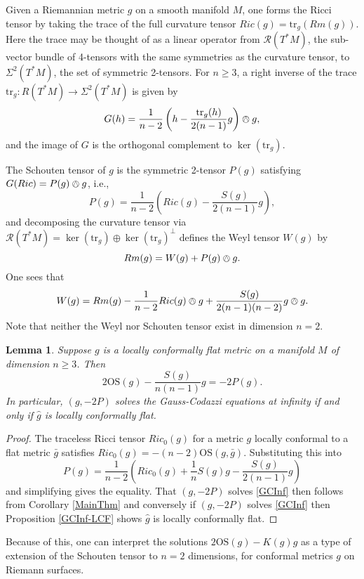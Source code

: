 \documentclass{amsart}
\newcommand{\tr}{\mathrm{tr}}
\newtheorem{lem}[thm]{Lemma}
\numberwithin{equation}{section}
\begin{document}
Given a Riemannian metric $g$ on a smooth manifold $M$, one forms the Ricci tensor by taking the trace of the full curvature tensor $Ric(g) = \tr_g(Rm(g))$.
Here the trace may be thought of as a linear operator from $\mathcal{R}(T^*M)$, the sub-vector bundle of 4-tensors with the same symmetries as the curvature tensor, to $\Sigma^2(T^*M)$, the set of symmetric 2-tensors.
For $n\geq 3$, a right inverse of the trace $\tr_g: R(T^*M) \to \Sigma^2(T^*M)$ is given by 
\[
G(h) = \frac{1}{n-2}\left( h - \frac{\tr_g(h)}{2(n-1)} g \right) \owedge g,
\]
and the image of $G$ is the orthogonal complement to $\ker(\tr_g)$.

The Schouten tensor of $g$ is the symmetric 2-tensor $P(g)$ satisfying $G(Ric) = P(g) \owedge g$, i.e., 
\[
P(g) = \frac{1}{n-2}\left( Ric(g) - \frac{S(g)}{2(n-1)} g \right),
\]
and decomposing the curvature tensor via $\mathcal{R}(T^*M) = \ker(\tr_g) \oplus \ker(\tr_g)^\perp$ defines the Weyl tensor $W(g)$ by 
\begin{equation}
\label{Weyl}
Rm(g) = W(g) + P(g)\owedge g.
\end{equation}
One sees that 
\[
W(g) = Rm(g) - \frac{1}{n-2}Ric(g) \owedge g + \frac{S(g)}{2(n-1)(n-2)} g \owedge g.
\]
Note that neither the Weyl nor Schouten tensor exist in dimension $n = 2$.
\begin{lem}
\label{SchoutenSolves}
Suppose $g$ is a locally conformally flat metric on a manifold $M$ of dimension $n \geq 3$. 
Then 
\[
2\mathrm{OS}(g) - \frac{S(g)}{n(n-1)}g = -2 P(g). 
\]
In particular, $(g,-2P)$ solves the Gauss-Codazzi equations at infinity if and only if $\hat{g}$ is locally conformally flat. 
\end{lem}

\begin{proof}
The traceless Ricci tensor $Ric_0(g)$ for a metric $g$ locally conformal to a flat metric $\bar{g}$ satisfies $Ric_0(g) = -(n-2)\mathrm{OS}(g,\bar{g})$.
Substituting this into
\[
P(g) = \frac{1}{n-2}\left( Ric_0(g) + \frac{1}{n}S(g)g - \frac{S(g)}{2(n-1)} g \right)
\]
and simplifying gives the equality.
That $(g,-2P)$ solves \ref{GCInf} then follows from Corollary \ref{MainThm} and conversely if $(g,-2P)$ solves \ref{GCInf} then Proposition \ref{GCInf-LCF} shows $\hat{g}$ is locally conformally flat. 
\end{proof}

Because of this, one can interpret the solutions $2\mathrm{OS}(g) - K(g)g$ as a type of extension of the Schouten tensor to $n=2$ dimensions, for conformal metrics $g$ on Riemann surfaces. 
\end{document}
